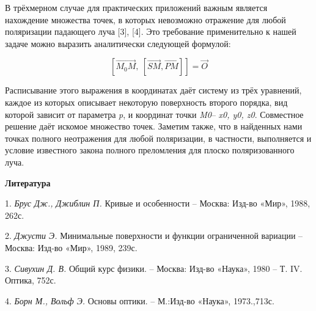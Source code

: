 В трёхмерном случае для практических приложений важным является нахождение множества точек, в которых невозможно отражение для любой поляризации падающего луча [3], [4]. Это требование применительно к нашей задаче можно выразить аналитически следующей формулой:

\[\left[\overrightarrow{M_0M},\ \left[\overrightarrow{SM},\overrightarrow{PM}\right]\right]=\overrightarrow{O}\]

Расписывание этого выражения в координатах даёт систему из трёх уравнений, каждое из которых описывает некоторую поверхность второго порядка, вид которой зависит от параметра \textit{p}, и координат точки \textit{M0}--  \textit{x0, y0, z0}. Совместное решение даёт искомое множество точек.
Заметим также, что в найденных нами точках полного неотражения для любой поляризации, в частности, выполняется и условие известного закона полного преломления для плоско поляризованного луча.

\smallskip \centerline{\bf Литература}\nopagebreak

1. {\it Брус Дж., Джиблин П.} Кривые и особенности -- Москва: Изд-во «Мир», 1988, 262с.

2. {\it Джусти Э.} Минимальные поверхности и функции ограниченной вариации -- Москва: Изд-во «Мир», 1989, 239с.

3. {\it Сивухин Д. В.} Общий курс физики. -- Москва: Изд-во «Наука», 1980 -- Т. IV. Оптика, 752с.

4. {\it Борн М., Вольф Э.} Основы оптики. --  М.:Изд-во «Наука», 1973.,713с.
